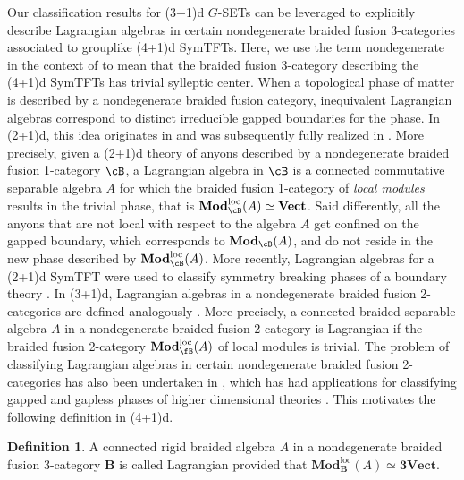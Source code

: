 \documentclass[11pt,reqno]{amsart}
\DeclareMathOperator{\loc}{\mathrm{loc}}
\newcommand{\Mod}{\mathbf{Mod}}
\newcommand{\Vect}{\mathbf{Vect}}
\numberwithin{equation}{section}
\theoremstyle{plain}
\theoremstyle{definition}
\newtheorem{defn}[equation]{Definition}
\begin{document}
Our classification results for (3+1)d $G$-SETs can be leveraged to explicitly describe Lagrangian algebras in certain nondegenerate braided fusion 3-categories associated to grouplike (4+1)d SymTFTs.
Here, we use the term nondegenerate in the context of  to mean that the braided fusion 3-category describing the (4+1)d SymTFTs has trivial sylleptic center.
When a topological phase of matter is described by a nondegenerate braided fusion category, inequivalent Lagrangian algebras correspond to distinct irreducible gapped boundaries for the phase.
In (2+1)d, this idea originates in \cite{BSS02,BSS03} and was subsequently fully realized in \cite{kong2014anyon}.
More precisely, given a (2+1)d theory of anyons described by a nondegenerate braided fusion 1-category $\cB$, a Lagrangian algebra in $\cB$ is a connected commutative separable algebra $A$ for which the braided fusion 1-category of \textit{local modules} results in the trivial phase, that is $\Mod^{\loc}_\cB(A)\simeq\Vect$.
Said differently, all the anyons that are not local with respect to the algebra $A$ get confined on the gapped boundary, which corresponds to $\Mod_\cB(A)$, and do not reside in the new phase described by $\Mod^{\loc}_\cB(A)$.
More recently, Lagrangian algebras for a (2+1)d SymTFT were used to classify symmetry breaking phases of a boundary theory \cite{Kong:2019byq,Kong:2019cuu,Kong:2021equ,Bhardwaj:2023fca}.
In (3+1)d, Lagrangian algebras in a nondegenerate braided fusion 2-categories are defined analogously \cite{ZLZHKT,DX}. More precisely, a connected braided separable algebra $A$ in a nondegenerate braided fusion 2-category is Lagrangian if the braided fusion 2-category $\Mod^{\loc}_\fB(A)$ of local modules is trivial.
The problem of classifying Lagrangian algebras in certain nondegenerate braided fusion 2-categories has also been undertaken in
\cite{xu:etale,Kong:2024ykr,Wen:2025thg}, which has had applications for classifying gapped and gapless phases of higher dimensional theories \cite{Bhardwaj:2024qiv,Bhardwaj:2023ayw}.
This motivates the following definition in (4+1)d.

\begin{defn}
    A connected rigid braided algebra $A$ in a nondegenerate braided fusion 3-category $\mathbf{B}$ is called Lagrangian provided that $\Mod^{\loc}_{\mathbf{B}}(A)\simeq \mathbf{3Vect}$.
\end{defn}
\end{document}
